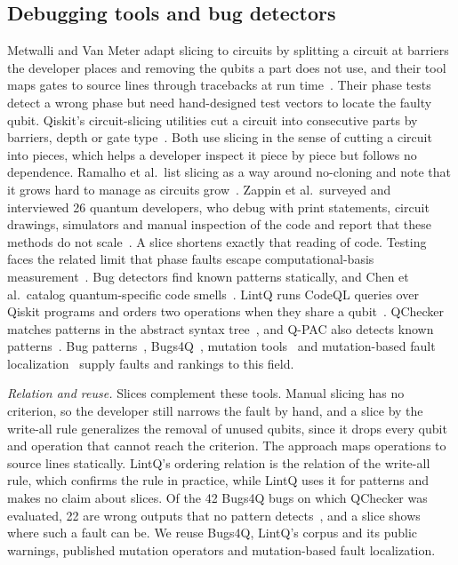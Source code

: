\subsection{Debugging tools and bug detectors}
Metwalli and Van Meter adapt slicing to circuits by splitting a circuit at barriers the developer places and
removing the qubits a part does not use, and their tool maps gates to source lines through tracebacks at run
time~\cite{metwalli2022debugging, metwalli2024testing}. Their phase tests detect a wrong phase but need
hand-designed test vectors to locate the faulty qubit. Qiskit's circuit-slicing utilities cut a circuit into consecutive parts by barriers, depth or gate
type~\cite{qiskitaddonutils}. Both use slicing in the sense of cutting a circuit into pieces, which helps a
developer inspect it piece by piece but follows no dependence. Ramalho et al.\ list slicing as a way around no-cloning and note that it grows hard to manage as circuits
grow~\cite{ramalho2025road}. Zappin et al.\ surveyed and interviewed 26 quantum developers, who debug with print statements, circuit
drawings, simulators and manual inspection of the code and report that these methods do not
scale~\cite{zappin2026challenges}. A slice shortens exactly that reading of code. Testing faces the related limit that phase faults escape computational-basis measurement~\cite{oldfield2024faster}.
Bug detectors find known patterns statically, and Chen et al.\ catalog quantum-specific code
smells~\cite{chen2023smelly}. LintQ runs CodeQL queries over Qiskit programs and orders two
operations when they share a qubit~\cite{paltenghi2024lintq}. QChecker matches patterns in the abstract syntax
tree~\cite{zhao2023qchecker}, and Q-PAC also detects known patterns~\cite{nayak2023qpac}. Bug
patterns~\cite{zhao2021bugpatterns}, Bugs4Q~\cite{zhao2023bugs4q}, mutation tools~\cite{mendiluze2021muskit,
fortunato2022qmutpy, garcia2022testing} and mutation-based fault localization~\cite{ishimoto2025mbfl} supply
faults and rankings to this field.

\emph{Relation and reuse.} Slices complement these tools. Manual slicing has no criterion, so the developer still
narrows the fault by hand, and a slice by the write-all rule generalizes the removal of unused qubits, since it
drops every qubit and operation that cannot reach the criterion. The \tool{} approach maps operations to source
lines statically. LintQ's ordering relation is the relation of the write-all rule, which confirms the rule in
practice, while LintQ uses it for patterns and makes no claim about slices. Of the 42 Bugs4Q bugs on which
QChecker was evaluated, 22 are wrong outputs that no pattern detects~\cite{zhao2023qchecker}, and a slice shows
where such a fault can be. We reuse Bugs4Q, LintQ's corpus and its
public warnings, published mutation operators and mutation-based fault localization.

